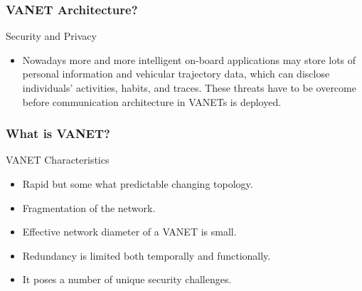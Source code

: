 \documentclass{beamer}
\begin{document}
\begin{frame}
	
	\frametitle{VANET Architecture?}
		\begin{block}{Security and Privacy}
		
			\begin{itemize}
			\item Nowadays more and more intelligent on-board applications may store lots of personal information and vehicular trajectory data, which can disclose individuals’ activities, habits, and traces. These threats have to be overcome before communication architecture in VANETs is deployed.
			
			\end{itemize}
		\end{block}
	
\end{frame}



\begin{frame}
	\frametitle{What is VANET?}
	\begin{block}{VANET Characteristics}
		\begin{itemize}
			\item Rapid but some what predictable changing topology.\\ 
			\item Fragmentation of the network.
			\item Effective network diameter of a VANET is small.\\ 
			\item Redundancy is limited both temporally and functionally.\\ 
			\item It poses a number of unique security challenges.\\
			
		\end{itemize}
	\end{block}
	
\end{frame}
\end{document}
